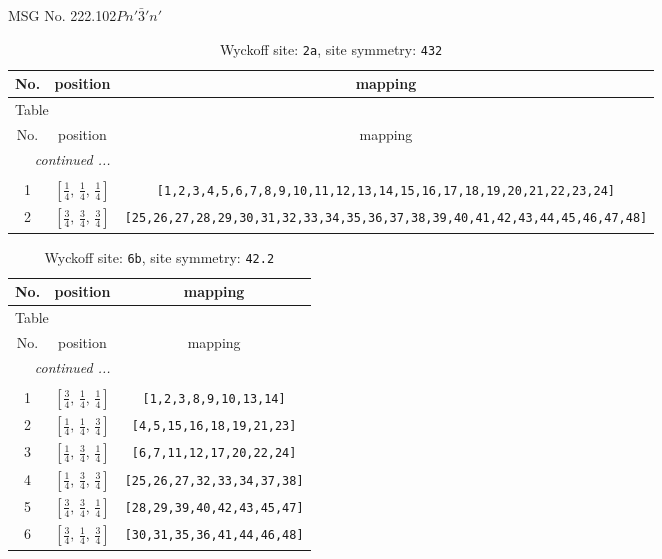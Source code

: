 \documentclass[fleqn,8pt]{jsarticle}
\begin{document}
\setcounter{MaxMatrixCols}{32}

\renewcommand{\tablename}{Table~}
\renewcommand{\figurename}{Figure~}
\begin{center}
\LARGE
MSG No. 222.102\quad$Pn'\bar{3}'n'$
\end{center}
\renewcommand{\arraystretch}{1.2}
\begin{longtable}{ccc}
\caption{Wyckoff site: {\tt 2a}, site symmetry: {\tt 432}}
 \\
 \hline \hline
No. & position & mapping \\ \hline \endfirsthead

\multicolumn{2}{l}{\tablename\ \thetable{}} \\
 \hline \hline
No. & position & mapping \\ \hline \endhead

 \hline \hline
\multicolumn{2}{r}{\footnotesize\it continued ...} \\ \endfoot

 \hline \hline
\multicolumn{2}{r}{} \\ \endlastfoot

1 & $\left[ \frac{1}{4},\, \frac{1}{4},\, \frac{1}{4} \right]$ & {\tt [1,2,3,4,5,6,7,8,9,10,11,12,13,14,15,16,17,18,19,20,21,22,23,24]} \\ \hline
2 & $\left[ \frac{3}{4},\, \frac{3}{4},\, \frac{3}{4} \right]$ & {\tt [25,26,27,28,29,30,31,32,33,34,35,36,37,38,39,40,41,42,43,44,45,46,47,48]} \\
\end{longtable}
\renewcommand{\arraystretch}{1.2}
\begin{longtable}{ccc}
\caption{Wyckoff site: {\tt 6b}, site symmetry: {\tt 42.2}}
 \\
 \hline \hline
No. & position & mapping \\ \hline \endfirsthead

\multicolumn{2}{l}{\tablename\ \thetable{}} \\
 \hline \hline
No. & position & mapping \\ \hline \endhead

 \hline \hline
\multicolumn{2}{r}{\footnotesize\it continued ...} \\ \endfoot

 \hline \hline
\multicolumn{2}{r}{} \\ \endlastfoot

1 & $\left[ \frac{3}{4},\, \frac{1}{4},\, \frac{1}{4} \right]$ & {\tt [1,2,3,8,9,10,13,14]} \\ \hline
2 & $\left[ \frac{1}{4},\, \frac{1}{4},\, \frac{3}{4} \right]$ & {\tt [4,5,15,16,18,19,21,23]} \\ \hline
3 & $\left[ \frac{1}{4},\, \frac{3}{4},\, \frac{1}{4} \right]$ & {\tt [6,7,11,12,17,20,22,24]} \\ \hline
4 & $\left[ \frac{1}{4},\, \frac{3}{4},\, \frac{3}{4} \right]$ & {\tt [25,26,27,32,33,34,37,38]} \\ \hline
5 & $\left[ \frac{3}{4},\, \frac{3}{4},\, \frac{1}{4} \right]$ & {\tt [28,29,39,40,42,43,45,47]} \\ \hline
6 & $\left[ \frac{3}{4},\, \frac{1}{4},\, \frac{3}{4} \right]$ & {\tt [30,31,35,36,41,44,46,48]} \\
\end{longtable}
\end{document}
